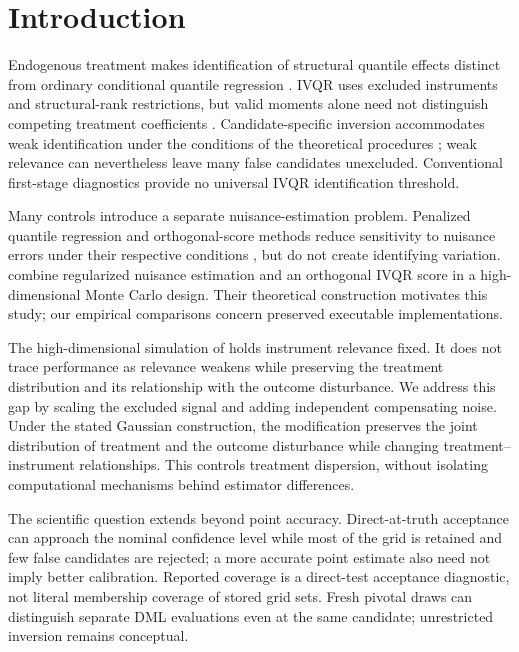 \section{Introduction}
Endogenous treatment makes identification of structural quantile effects distinct from ordinary conditional quantile regression \parencite{koenker_bassett_1978,chernozhukov_hansen_2005}. IVQR uses excluded instruments and structural-rank restrictions, but valid moments alone need not distinguish competing treatment coefficients \parencite{chernozhukov_hansen_wuthrich_2017}. Candidate-specific inversion accommodates weak identification under the conditions of the theoretical procedures \parencite{chernozhukov_hansen_2008}; weak relevance can nevertheless leave many false candidates unexcluded. Conventional first-stage diagnostics provide no universal IVQR identification threshold.

Many controls introduce a separate nuisance-estimation problem. Penalized quantile regression and orthogonal-score methods reduce sensitivity to nuisance errors under their respective conditions \parencite{belloni_chernozhukov_2011,belloni_chernozhukov_kato_2019,chernozhukov_et_al_2018}, but do not create identifying variation. \textcite{chen_huang_tien_2021} combine regularized nuisance estimation and an orthogonal IVQR score in a high-dimensional Monte Carlo design. Their theoretical construction motivates this study; our empirical comparisons concern preserved executable implementations.

The high-dimensional simulation of \textcite{chen_huang_tien_2021} holds instrument relevance fixed. It does not trace performance as relevance weakens while preserving the treatment distribution and its relationship with the outcome disturbance. We address this gap by scaling the excluded signal and adding independent compensating noise. Under the stated Gaussian construction, the modification preserves the joint distribution of treatment and the outcome disturbance while changing treatment--instrument relationships. This controls treatment dispersion, without isolating computational mechanisms behind estimator differences.

The scientific question extends beyond point accuracy. Direct-at-truth acceptance can approach the nominal confidence level while most of the grid is retained and few false candidates are rejected; a more accurate point estimate also need not imply better calibration. Reported coverage is a direct-test acceptance diagnostic, not literal membership coverage of stored grid sets. Fresh pivotal draws can distinguish separate DML evaluations even at the same candidate; unrestricted inversion remains conceptual.

